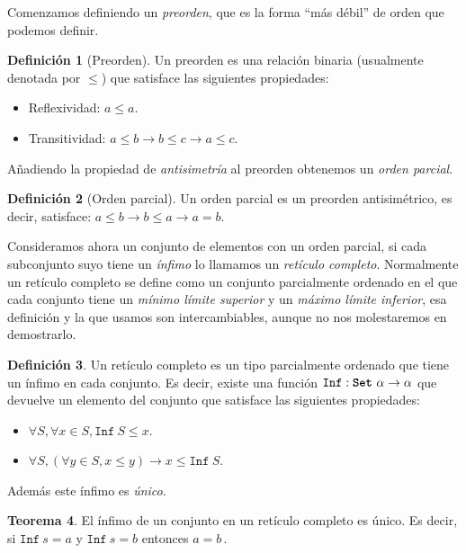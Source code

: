 \documentclass[
  a4paper, 
  10pt, 
  parskip=half, 
  toc=bibliography,
]{scrbook}
\theoremstyle{definition}
\theoremstyle{bolddef}
\newtheorem{theorem}{Teorema}[section]
\newtheorem{definition}[theorem]{Definición}
\newcommand{\funfont}[1]{\texttt{#1}}
\newcommand{\tyfont}[1]{\texttt{\textbf{#1}}}
\renewcommand{\implies}{\rightarrow}
\begin{document}
Comenzamos definiendo un \emph{preorden}, que es la forma \enquote{más débil}
de orden que podemos definir.

\begin{definition}[Preorden]
  Un preorden es una relación binaria (usualmente denotada por \(\leq\)) que
  satisface las siguientes propiedades:
  \begin{itemize}
    \item Reflexividad: \(a \leq a\).
    \item Transitividad: \(a \leq b \to b \leq c \to a \leq c\).
  \end{itemize}
\end{definition}

Añadiendo la propiedad de \emph{antisimetría} al preorden obtenemos un \emph{orden parcial}.

\begin{definition}[Orden parcial]
  Un orden parcial es un preorden antisimétrico, es decir, satisface:
  \(a \leq b \to b \leq a \to a = b\).
\end{definition}

Consideramos ahora un conjunto de elementos con un orden parcial, si cada subconjunto
suyo tiene un \emph{ínfimo} lo llamamos un \emph{retículo completo}.
Normalmente un retículo completo se define como un conjunto parcialmente ordenado
en el que cada conjunto tiene un \emph{mínimo límite superior} y un \emph{máximo límite inferior},
esa definición y la que usamos son intercambiables, aunque no nos molestaremos en demostrarlo.

\begin{definition}
  Un retículo completo es un tipo parcialmente ordenado que tiene un ínfimo en cada conjunto.
  Es decir, existe una función \(\funfont{Inf}: \tyfont{Set} \ \alpha \to \alpha\)
  que devuelve un elemento del conjunto que satisface las siguientes propiedades:
  \begin{itemize}
    \item \(\forall S, \forall x \in S, \funfont{Inf} \ S \leq x\).
    \item \(\forall S, (\forall y \in S, x \leq y) \implies x \leq \funfont{Inf} \ S\).
  \end{itemize}
\end{definition}

Además este ínfimo es \emph{único}.

\begin{theorem}
  El ínfimo de un conjunto en un retículo completo es único.
  Es decir, si \(\funfont{Inf} \ s = a\) y \(\funfont{Inf} \ s = b\) entonces \(a = b\,\).
\end{theorem}
\end{document}
